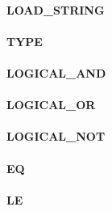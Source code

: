 \documentclass[12pt,a4paper]{article}
\begin{document}
\vspace{2em}\begin{minipage}{\textwidth}
\paragraph{LOAD\_STRING}
\end{minipage}

\vspace{2em}\begin{minipage}{\textwidth}
\paragraph{TYPE}
\end{minipage}

\vspace{2em}\begin{minipage}{\textwidth}
\paragraph{LOGICAL\_AND}
\end{minipage}

\vspace{2em}\begin{minipage}{\textwidth}
\paragraph{LOGICAL\_OR}
\end{minipage}

\vspace{2em}\begin{minipage}{\textwidth}
\paragraph{LOGICAL\_NOT}
\end{minipage}

\vspace{2em}\begin{minipage}{\textwidth}
\paragraph{EQ}
\end{minipage}

\vspace{2em}\begin{minipage}{\textwidth}
\paragraph{LE}
\end{minipage}
\end{document}
